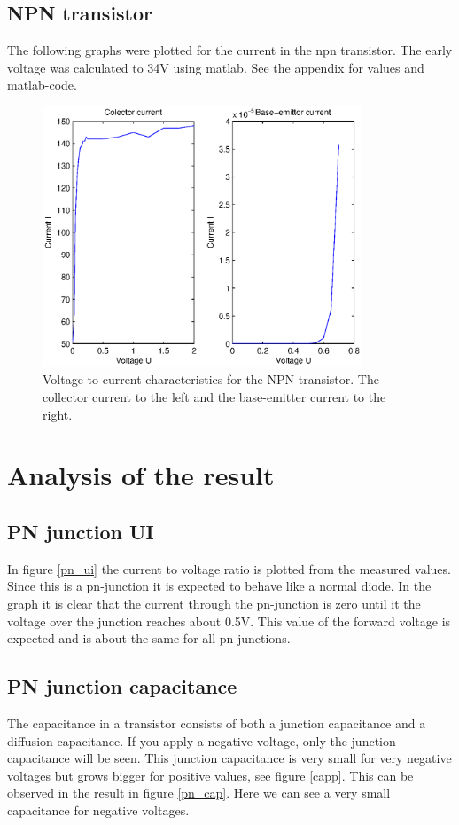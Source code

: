 \documentclass[a4paper]{article}
\begin{document}
\subsection{NPN transistor}
The following graphs were plotted for the current in the npn transistor. The early voltage was calculated to 34V using matlab. See the appendix for values and matlab-code.
\begin{figure}[H]
	\centering
	\includegraphics[width=0.85\textwidth]{npn.eps}
	\caption{Voltage to current characteristics for the NPN transistor. The collector current to the left and the base-emitter current to the right.}	
	\label{npn}
\end{figure}

\newpage
\section{Analysis of the result}
\subsection{PN junction UI}
In figure \ref{pn_ui} the current to voltage ratio is plotted from the measured values. Since this is a pn-junction it is expected to behave like a normal diode. In the graph it is clear that the current through the pn-junction is zero until it the voltage over the junction reaches about 0.5V. This value of the forward voltage is expected and is about the same for all pn-junctions.

\subsection{PN junction capacitance}
The capacitance in a transistor consists of both a junction capacitance and a diffusion capacitance. If you apply a negative voltage, only the junction capacitance will be seen. This junction capacitance is very small for very negative voltages but grows bigger for positive values, see figure \ref{capp}. This can be observed in the result in figure \ref{pn_cap}. Here we can see a very small capacitance for negative voltages.
\end{document}
